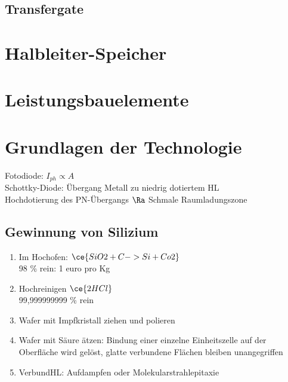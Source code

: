 \documentclass[fs, footer]{latex4ei}
\begin{document}
\begin{multicols*}{4}
	\subsection{Transfergate}




\section{Halbleiter-Speicher}



\section{Leistungsbauelemente}




\section{Grundlagen der Technologie}

Fotodiode: $I_{ph} \propto A$\\
Schottky-Diode: Übergang Metall zu niedrig dotiertem HL\\
Hochdotierung des PN-Übergangs $\Ra$ Schmale Raumladungszone\\


	\subsection{Gewinnung von Silizium}
	
	\begin{enumerate}
		\item Im Hochofen: $\ce{SiO2 + C -> Si + Co2}$\\
			98 \% rein: 1 euro pro Kg
		\item Hochreinigen $\ce{2HCl}$\\
		99,999999999 \% rein
		\item Wafer mit Impfkristall ziehen und polieren
		\item Wafer mit Säure ätzen: Bindung einer einzelne Einheitszelle auf der Oberfläche wird gelöst, glatte verbundene Flächen bleiben unangegriffen
		\item VerbundHL: Aufdampfen oder Molekularstrahlepitaxie 
	\end{enumerate}
	

\end{multicols*}
\end{document}
